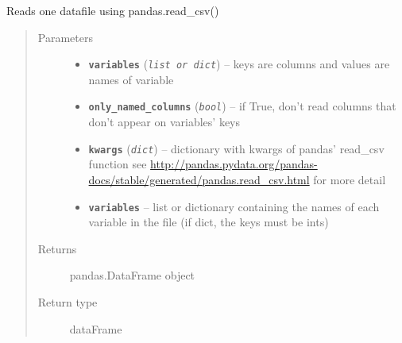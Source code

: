 \documentclass[a4paper,10pt,oneside]{sphinxmanual}
\begin{document}
\begin{fulllineitems}
\label{pymicra:pymicra.io.readDataFile}
Reads one datafile using pandas.read\_csv()
\begin{quote}\begin{description}
\item[{Parameters}] \leavevmode\begin{itemize}
\item {} 
\textbf{\texttt{variables}} (\emph{\texttt{list or dict}}) -- keys are columns and values are names of variable

\item {} 
\textbf{\texttt{only\_named\_columns}} (\emph{\texttt{bool}}) -- if True, don't read columns that don't appear on variables' keys

\item {} 
\textbf{\texttt{kwargs}} (\emph{\texttt{dict}}) -- dictionary with kwargs of pandas' read\_csv function
see \url{http://pandas.pydata.org/pandas-docs/stable/generated/pandas.read\_csv.html} for more detail

\item {} 
\textbf{\texttt{variables}} -- list or dictionary containing the names of each variable in the file (if dict, the keys must be ints)

\end{itemize}

\item[{Returns}] \leavevmode
pandas.DataFrame object

\item[{Return type}] \leavevmode
dataFrame

\end{description}\end{quote}

\end{fulllineitems}

\end{document}
